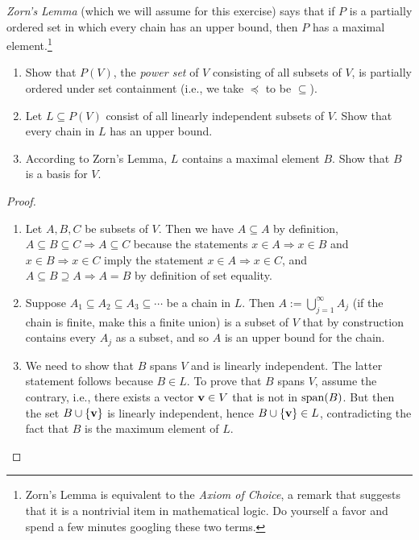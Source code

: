 \documentclass[11pt]{amsart}
\begin{document}
\begin{enumerate}[(1)]
\emph{Zorn's Lemma} (which we will assume for this exercise) says that if $P$ is a partially ordered set in which every chain has an upper bound, then $P$ has a maximal element.\footnote{Zorn's Lemma is equivalent to the \emph{Axiom of Choice}, a remark that suggests that it is a nontrivial item in mathematical logic. Do yourself a favor and spend a few minutes googling these two terms.}

  \begin{enumerate}
  \item Show that $P(V)$, the \emph{power set} of $V$ consisting of all subsets of $V$, is partially ordered under set containment (i.e., we take $\preceq$ to be $\subseteq$).
  \item Let $L \subseteq P(V)$ consist of all linearly independent subsets of $V$. Show that every chain in $L$ has an upper bound.
  \item According to Zorn's Lemma, $L$ contains a maximal element $B$. Show that $B$ is a basis for $V$.
  \end{enumerate}

\begin{proof}
\begin{enumerate}

\item Let $A, B, C$ be subsets of $V$.
Then we have $A \subseteq A$ by definition, $A \subseteq B \subseteq C \Longrightarrow A \subseteq C$ because the statements $x \in A \Longrightarrow x \in B$ and $x \in B \Longrightarrow x \in C$ imply the statement $x \in A \Longrightarrow x \in C$, and $A \subseteq B \supseteq A \Longrightarrow A=B$ by definition of set equality.

\item Suppose $A_1 \subseteq A_2 \subseteq A_3 \subseteq \cdots$ be a chain in $L$. Then $A := \bigcup_{ j=1 }^\infty A_j$ (if the chain is finite, make this a finite union) is a subset of $V$ that by construction contains every $A_j$ as a subset, and so $A$ is an upper bound for the chain.

\item We need to show that $B$ spans $V$ and is linearly independent. The latter statement follows because $B \in L$.
To prove that $B$ spans $V$, assume the contrary, i.e., there exists a vector $\mathbf v \in V$ that is not in $\operatorname{span}(B)$. But then the set $B \cup \{ \mathbf v \}$ is linearly independent, hence $B \cup \{ \mathbf v \} \in L$, contradicting the fact that $B$ is the maximum element of $L$. \qedhere

\end{enumerate}
\end{proof}


\end{enumerate}
\end{document}

